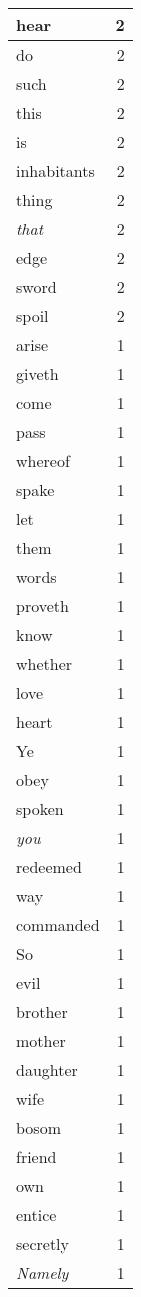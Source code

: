 \begin{center}
\begin{longtable}{l|r}
hear & 2 \\ \hline
do & 2 \\ \hline
such & 2 \\ \hline
this & 2 \\ \hline
is & 2 \\ \hline
inhabitants & 2 \\ \hline
thing & 2 \\ \hline
\emph{that} & 2 \\ \hline
edge & 2 \\ \hline
sword & 2 \\ \hline
spoil & 2 \\ \hline
arise & 1 \\ \hline
giveth & 1 \\ \hline
come & 1 \\ \hline
pass & 1 \\ \hline
whereof & 1 \\ \hline
spake & 1 \\ \hline
let & 1 \\ \hline
them & 1 \\ \hline
words & 1 \\ \hline
proveth & 1 \\ \hline
know & 1 \\ \hline
whether & 1 \\ \hline
love & 1 \\ \hline
heart & 1 \\ \hline
Ye & 1 \\ \hline
obey & 1 \\ \hline
spoken & 1 \\ \hline
\emph{you} & 1 \\ \hline
redeemed & 1 \\ \hline
way & 1 \\ \hline
commanded & 1 \\ \hline
So & 1 \\ \hline
evil & 1 \\ \hline
brother & 1 \\ \hline
mother & 1 \\ \hline
daughter & 1 \\ \hline
wife & 1 \\ \hline
bosom & 1 \\ \hline
friend & 1 \\ \hline
own & 1 \\ \hline
entice & 1 \\ \hline
secretly & 1 \\ \hline
\emph{Namely} & 1 \\ \hline

\end{longtable}
\end{center}
